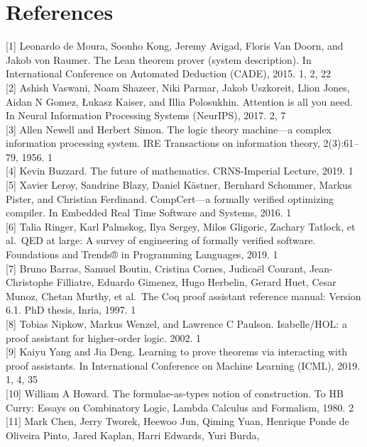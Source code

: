 \documentclass[
]{article}
\begin{document}
\section{References}\label{references}

{[}1{]} Leonardo de Moura, Soonho Kong, Jeremy Avigad, Floris Van Doorn,
and Jakob von Raumer. The Lean theorem prover (system description). In
International Conference on Automated Deduction (CADE), 2015. 1, 2, 22\\
{[}2{]} Ashish Vaswani, Noam Shazeer, Niki Parmar, Jakob Uszkoreit,
Llion Jones, Aidan N Gomez, Łukasz Kaiser, and Illia Polosukhin.
Attention is all you need. In Neural Information Processing Systems
(NeurIPS), 2017. 2, 7\\
{[}3{]} Allen Newell and Herbert Simon. The logic theory machine---a
complex information processing system. IRE Transactions on information
theory, 2(3):61--79, 1956. 1\\
{[}4{]} Kevin Buzzard. The future of mathematics. CRNS-Imperial Lecture,
2019. 1\\
{[}5{]} Xavier Leroy, Sandrine Blazy, Daniel Kästner, Bernhard Schommer,
Markus Pister, and Christian Ferdinand. CompCert---a formally verified
optimizing compiler. In Embedded Real Time Software and Systems, 2016.
1\\
{[}6{]} Talia Ringer, Karl Palmskog, Ilya Sergey, Milos Gligoric,
Zachary Tatlock, et al.~QED at large: A survey of engineering of
formally verified software. Foundations and Trends® in Programming
Languages, 2019. 1\\
{[}7{]} Bruno Barras, Samuel Boutin, Cristina Cornes, Judicaël Courant,
Jean-Christophe Filliatre, Eduardo Gimenez, Hugo Herbelin, Gerard Huet,
Cesar Munoz, Chetan Murthy, et al.~The Coq proof assistant reference
manual: Version 6.1. PhD thesis, Inria, 1997. 1\\
{[}8{]} Tobias Nipkow, Markus Wenzel, and Lawrence C Paulson.
Isabelle/HOL: a proof assistant for higher-order logic. 2002. 1\\
{[}9{]} Kaiyu Yang and Jia Deng. Learning to prove theorems via
interacting with proof assistants. In International Conference on
Machine Learning (ICML), 2019. 1, 4, 35\\
{[}10{]} William A Howard. The formulae-as-types notion of construction.
To HB Curry: Essays on Combinatory Logic, Lambda Calculus and Formalism,
1980. 2\\
{[}11{]} Mark Chen, Jerry Tworek, Heewoo Jun, Qiming Yuan, Henrique
Ponde de Oliveira Pinto, Jared Kaplan, Harri Edwards, Yuri Burda,
\end{document}
